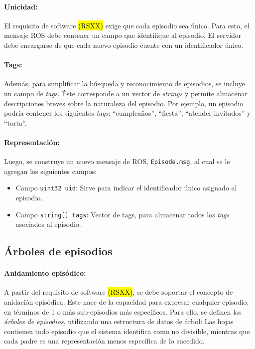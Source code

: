 \paragraph{Unicidad:}
El requisito de software \hl{(RSXX)} exige que cada episodio sea único. Para esto, el mensaje ROS debe contener un campo que identifique al episodio. El servidor debe encargarse de que cada nuevo episodio cuente con un identificador único.

\paragraph{Tags:}
Además, para simplificar la búsqueda y reconocimiento de episodios, se incluye un campo de \textit{tags}. Éste corresponde a un vector de \textit{strings} y permite almacenar descripciones breves sobre la naturaleza del episodio. Por ejemplo, un episodio podría contener los siguientes \textit{tags}: ``cumpleaños'', ``fiesta'', ``atender invitados'' y ``torta''.

\paragraph{Representación:}
Luego, se construye un nuevo mensaje de ROS, \texttt{Episode.msg}, al cual se le agregan los siguientes campos:
\begin{itemize}
\item Campo \texttt{uint32 uid}: Sirve para indicar el identificador único asignado al episodio.
\item Campo \texttt{string[] tags}: Vector de tags, para almacenar todos los \textit{tags} asociados al episodio.
\end{itemize}

 
\subsection{Árboles de episodios}



\paragraph{Anidamiento episódico:}
A partir del requisito de software \hl{(RSXX)}, se debe soportar el concepto de anidación episódica. Este nace de la capacidad para expresar cualquier episodio, en términos de 1 o más sub-episodios más específicos. Para ello, se definen los \textit{árboles de episodios}, utilizando una estructura de datos de árbol: Las hojas contienen todo episodio que el sistema identifica como no divisible, mientras que cada padre es una representación menos específica de lo sucedido.

